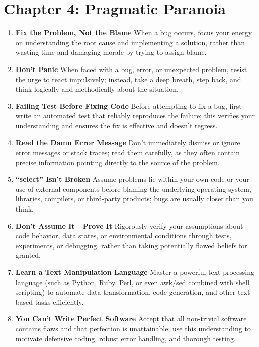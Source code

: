 \documentclass[11pt]{article}
\begin{document}
\section*{Chapter 4: Pragmatic Paranoia}
\begin{enumerate}[label=\arabic*., start=29, itemsep=1ex]
    \item \textbf{Fix the Problem, Not the Blame}
    When a bug occurs, focus your energy on understanding the root cause and implementing a solution, rather than wasting time and damaging morale by trying to assign blame.

    \item \textbf{Don’t Panic}
    When faced with a bug, error, or unexpected problem, resist the urge to react impulsively; instead, take a deep breath, step back, and think logically and methodically about the situation.

    \item \textbf{Failing Test Before Fixing Code}
    Before attempting to fix a bug, first write an automated test that reliably reproduces the failure; this verifies your understanding and ensures the fix is effective and doesn't regress.

    \item \textbf{Read the Damn Error Message}
    Don't immediately dismiss or ignore error messages or stack traces; read them carefully, as they often contain precise information pointing directly to the source of the problem.

    \item \textbf{“select” Isn’t Broken}
    Assume problems lie within your own code or your use of external components before blaming the underlying operating system, libraries, compilers, or third-party products; bugs are usually closer than you think.

    \item \textbf{Don’t Assume It—Prove It}
    Rigorously verify your assumptions about code behavior, data states, or environmental conditions through tests, experiments, or debugging, rather than taking potentially flawed beliefs for granted.

    \item \textbf{Learn a Text Manipulation Language}
    Master a powerful text processing language (such as Python, Ruby, Perl, or even awk/sed combined with shell scripting) to automate data transformation, code generation, and other text-based tasks efficiently.

    \item \textbf{You Can’t Write Perfect Software}
    Accept that all non-trivial software contains flaws and that perfection is unattainable; use this understanding to motivate defensive coding, robust error handling, and thorough testing.


\end{enumerate}
\end{document}

